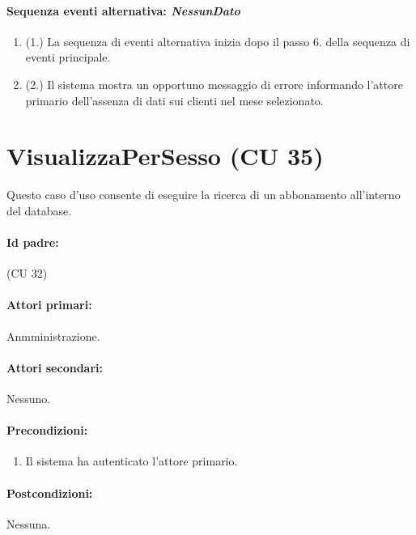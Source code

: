 \documentclass{article}
\begin{document}
		\paragraph{Sequenza eventi alternativa: \textit{NessunDato}}
	\begin{enumerate}	[leftmargin=28pt]
			\item  (1.) La sequenza di eventi alternativa inizia dopo il passo 6. della sequenza di eventi principale.
			\item  (2.) Il sistema mostra un opportuno messaggio di errore informando l'attore primario dell'assenza di dati sui clienti nel mese selezionato.
		\end{enumerate}




	
	
\newpage
\section*{VisualizzaPerSesso (CU 35)}
	
	Questo caso d'uso consente di eseguire la ricerca di un abbonamento all'interno del database.
	
	\paragraph{Id padre:} (CU 32)
	
	\paragraph{Attori primari:}Anmministrazione.
	
	\paragraph{Attori secondari:}Nessuno.
	
	\paragraph{Precondizioni:}
	\begin{enumerate}[itemsep=8pt,parsep=0pt]
		\item Il sistema ha autenticato l'attore primario.
	\end{enumerate}
	
	\paragraph{Postcondizioni:}Nessuna.
\end{document}
